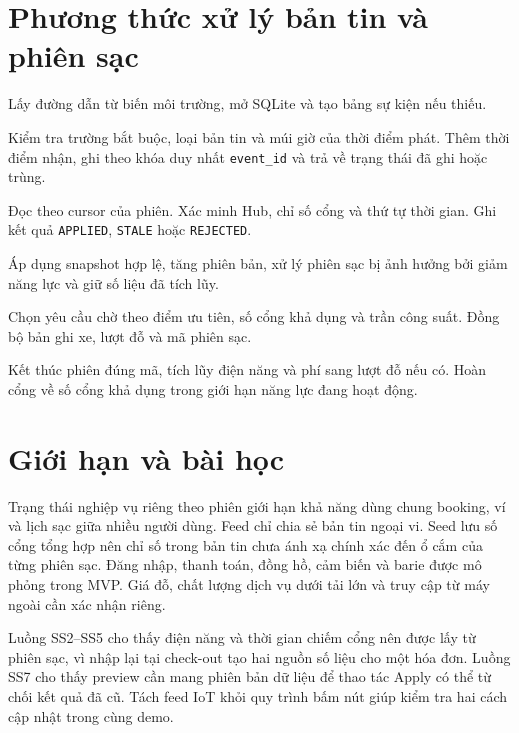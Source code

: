 \section{Phương thức xử lý bản tin và phiên sạc}
\begin{description}[style=nextline,leftmargin=0pt,labelindent=0pt]
\item[\texttt{feed\_path()} và \texttt{connect\_feed(path)}]
Lấy đường dẫn từ biến môi trường, mở SQLite và tạo bảng sự kiện nếu thiếu.
\item[\texttt{publish\_event(event, path)}]
Kiểm tra trường bắt buộc, loại bản tin và múi giờ của thời điểm phát.
Thêm thời điểm nhận, ghi theo khóa duy nhất \texttt{event\_id}
và trả về trạng thái đã ghi hoặc trùng.
\item[\texttt{consume\_events(state, path)}]
Đọc theo cursor của phiên. Xác minh Hub, chỉ số cổng và thứ tự thời gian.
Ghi kết quả \texttt{APPLIED}, \texttt{STALE} hoặc \texttt{REJECTED}.
\item[\texttt{apply\_hub\_snapshot(state, hubs)}]
Áp dụng snapshot hợp lệ, tăng phiên bản, xử lý phiên sạc bị ảnh hưởng bởi
giảm năng lực và giữ số liệu đã tích lũy.
\item[\texttt{allocate\_hub\_ports(state, hub\_id)}]
Chọn yêu cầu chờ theo điểm ưu tiên, số cổng khả dụng và trần công suất.
Đồng bộ bản ghi xe, lượt đỗ và mã phiên sạc.
\item[\texttt{release\_charging\_session(state, session\_id)}]
Kết thúc phiên đúng mã, tích lũy điện năng và phí sang lượt đỗ nếu có.
Hoàn cổng về số cổng khả dụng trong giới hạn năng lực đang hoạt động.
\end{description}

\section{Giới hạn và bài học}
Trạng thái nghiệp vụ riêng theo phiên giới hạn khả năng dùng chung booking, ví và
lịch sạc giữa nhiều người dùng. Feed chỉ chia sẻ bản tin ngoại vi. Seed lưu số cổng
tổng hợp nên chỉ số trong bản tin chưa ánh xạ chính xác đến ổ cắm của từng phiên sạc.
Đăng nhập, thanh toán, đồng hồ, cảm biến và barie được mô phỏng trong MVP.
Giá đỗ, chất lượng dịch vụ dưới tải lớn và truy cập từ máy ngoài cần xác nhận riêng.
\par
Luồng SS2--SS5 cho thấy điện năng và thời gian chiếm cổng nên được lấy từ phiên sạc,
vì nhập lại tại check-out tạo hai nguồn số liệu cho một hóa đơn. Luồng SS7 cho thấy
preview cần mang phiên bản dữ liệu để thao tác Apply có thể từ chối kết quả đã cũ.
Tách feed IoT khỏi quy trình bấm nút giúp kiểm tra hai cách cập nhật trong cùng demo.
